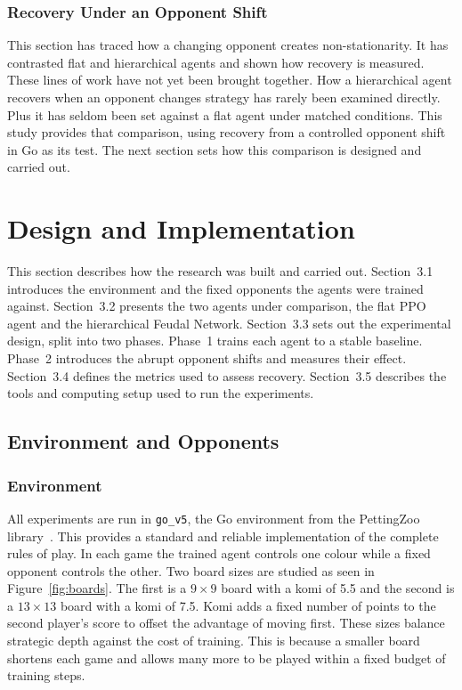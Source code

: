 \documentclass[sigconf,nonacm]{acmart}
\begin{document}
\subsubsection{Recovery Under an Opponent Shift} This section has traced how a changing opponent creates non-stationarity. It has contrasted flat and hierarchical agents and shown how recovery is measured. These lines of work have not yet been brought together. How a hierarchical agent recovers when an opponent changes strategy has rarely been examined directly. Plus it has seldom been set against a flat agent under matched conditions. This study provides that comparison, using recovery from a controlled opponent shift in Go as its test. The next section sets how this comparison is designed and carried out.


\section{Design and Implementation}

This section describes how the research was built and carried out. Section~3.1
introduces the environment and the fixed opponents the agents were trained
against. Section~3.2 presents the two agents under comparison, the flat PPO agent
and the hierarchical Feudal Network. Section~3.3 sets out the experimental design,
split into two phases. Phase~1 trains each agent to a stable baseline. Phase~2
introduces the abrupt opponent shifts and measures their effect. Section~3.4
defines the metrics used to assess recovery. Section~3.5 describes the tools and
computing setup used to run the experiments.

\subsection{Environment and Opponents}

\subsubsection{Environment}
All experiments are run in \texttt{go\_v5}, the Go environment from the PettingZoo
library~\cite{terry2021pettingzoo}. This provides a standard and reliable
implementation of the complete rules of play. In each game the trained agent controls
one colour while a fixed opponent controls the other. Two board sizes are studied as seen in Figure~\ref{fig:boards}. The first is a $9\times9$ board
with a komi of 5.5 and the second is a $13\times13$ board with a komi of 7.5. Komi
adds a fixed number of points to the second player's score to offset the
advantage of moving first. These
sizes balance strategic depth against the cost of training. This is because a smaller board
shortens each game and allows many more to be played within a fixed budget of training steps. 
\end{document}
